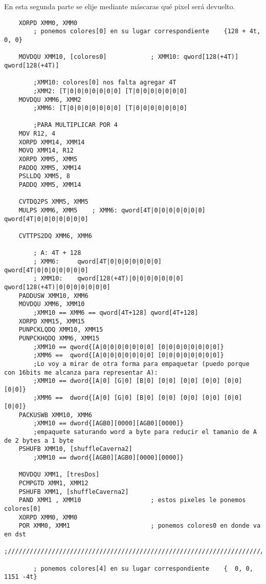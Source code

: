 En esta segunda parte se elije mediante m\'ascaras qu\'e pixel ser\'a devuelto. 
\begin{codesnippet}
\begin{verbatim}
    XORPD XMM0, XMM0
        ; ponemos colores[0] en su lugar correspondiente	{128 + 4t, 0, 0}
    
    MOVDQU XMM10, [colores0] 			; XMM10: qword[128(+4T)] qword[128(+4T)] 
    
        ;XMM10: colores[0] nos falta agregar 4T
        ;XMM2: [T|0|0|0|0|0|0|0] [T|0|0|0|0|0|0|0]
    MOVDQU XMM6, XMM2
        ;XMM6: [T|0|0|0|0|0|0|0] [T|0|0|0|0|0|0|0]
    
        ;PARA MULTIPLICAR POR 4
    MOV R12, 4
    XORPD XMM14, XMM14
    MOVQ XMM14, R12
    XORPD XMM5, XMM5
    PADDQ XMM5, XMM14
    PSLLDQ XMM5, 8
    PADDQ XMM5, XMM14
    
    CVTDQ2PS XMM5, XMM5
    MULPS XMM6, XMM5	; XMM6: qword[4T|0|0|0|0|0|0|0] qword[4T|0|0|0|0|0|0|0]
    
    CVTTPS2DQ XMM6, XMM6
    
        ; A: 4T + 128
        ; XMM6: 	qword[4T|0|0|0|0|0|0|0] 		qword[4T|0|0|0|0|0|0|0]
        ; XMM10: 	qword[128(+4T)|0|0|0|0|0|0|0] 	qword[128(+4T)|0|0|0|0|0|0|0]
    PADDUSW XMM10, XMM6
    MOVDQU XMM6, XMM10
        ;XMM10 == XMM6 == qword[4T+128] qword[4T+128]
    XORPD XMM15, XMM15
    PUNPCKLQDQ XMM10, XMM15
    PUNPCKHQDQ XMM6, XMM15
        ;XMM10 == qword{[A|0|0|0|0|0|0|0] [0|0|0|0|0|0|0|0]}
        ;XMM6 ==  qword{[A|0|0|0|0|0|0|0] [0|0|0|0|0|0|0|0]}
        ;Lo voy a mirar de otra forma para empaquetar (puedo porque con 16bits me alcanza para representar A):
        ;XMM10 == dword{[A|0] [G|0] [B|0] [0|0] [0|0] [0|0] [0|0] [0|0]}
        ;XMM6 ==  dword{[A|0] [G|0] [B|0] [0|0] [0|0] [0|0] [0|0] [0|0]}
    PACKUSWB XMM10, XMM6
        ;XMM10 == dword{[AGB0][0000][AGB0][0000]}
        ;empaquete saturando word a byte para reducir el tamanio de A de 2 bytes a 1 byte
    PSHUFB XMM10, [shuffleCaverna2]
        ;XMM10 == dword{[AGB0][AGB0][0000][0000]}
    
    MOVDQU XMM1, [tresDos] 
    PCMPGTD XMM1, XMM12	
    PSHUFB XMM1, [shuffleCaverna2]
    PAND XMM1 , XMM10 					; estos pixeles le ponemos colores[0]
    XORPD XMM0, XMM0
    POR XMM0, XMM1						; ponemos colores0 en donde va en dst
	;///////////////////////////////////////////////////////////////////////////////////////////////////

        ; ponemos colores[4] en su lugar correspondiente	{  0, 0, 1151 -4t}


\end{verbatim}
\end{codesnippet}
